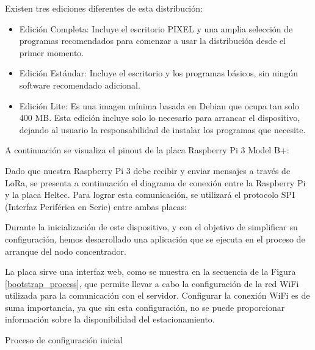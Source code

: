Existen tres ediciones diferentes de esta distribución:

\begin{itemize}
    \item Edición Completa: Incluye el escritorio PIXEL y una amplia selección de programas recomendados para comenzar a usar la distribución desde el primer momento.
    \item Edición Estándar: Incluye el escritorio y los programas básicos, sin ningún software recomendado adicional.
    \item Edición Lite: Es una imagen mínima basada en Debian que ocupa tan solo 400 MB. Esta edición incluye solo lo necesario para arrancar el dispositivo, dejando al usuario la responsabilidad de instalar los programas que necesite.
\end{itemize}

A continuación se visualiza el pinout de la placa Raspberry Pi 3 Model B+:


Dado que nuestra Raspberry Pi 3 debe recibir y enviar mensajes a través de LoRa, se presenta a continuación el diagrama de conexión entre la Raspberry Pi y la placa Heltec. Para lograr esta comunicación, se utilizará el protocolo SPI (Interfaz Periférica en Serie) entre ambas placas:


Durante la inicialización de este dispositivo, y con el objetivo de simplificar su configuración, hemos desarrollado una aplicación que se ejecuta en el proceso de arranque del nodo concentrador.

La placa sirve una interfaz web, como se muestra en la secuencia de la Figura \ref{bootstrap_process}, que permite llevar a cabo la configuración de la red WiFi utilizada para la comunicación con el servidor. Configurar la conexión WiFi es de suma importancia, ya que sin esta configuración, no se puede proporcionar información sobre la disponibilidad del estacionamiento.

\begin{images}[\label{bootstrap_process}]{Proceso de configuración inicial}
\end{images}

